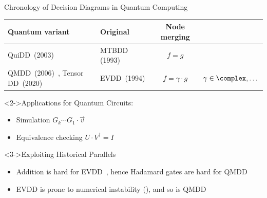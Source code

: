 \begin{refframe}{Chronology of Decision Diagrams in Quantum Computing}
	
\vspace{-.8em}

	
\begin{table}
\centering\footnotesize
\def\arraystretch{1.5}
\begin{tabular}{|p{4.5cm}|p{1.5cm}|c|c|}
\hline
\textbf{Quantum variant}	&
\textbf{Original}				& \textbf{Node merging} &  \\\hline
 QuiDD~(2003)~\cite{viamontes2003improving}					    &MTBDD (1993)  & $f = g$  &  \\
 QMDD~(2006)~\cite{qmdd}, Tensor DD~(2020)~\cite{hong2022tensor}   & EVDD~(1994)  &$f = \gamma\cdot g$   & $\gamma \in \complex, \dots$  \\
\hline
\end{tabular}
\end{table}

\vspace{-.3em}



\begin{block}<2->{Applications for Quantum Circuits:}
\begin{itemize}
	\item Simulation			\hfill   $G_k\cdots G_1 \cdot \vec v$
	\item Equivalence checking	 \hfill $U \cdot V^\dagger = I$
\end{itemize}
\end{block}


\begin{alertblock}<3->{Exploiting Historical Parallels}
	\begin{itemize}
	\item<+-> Addition is hard for EVDD~\cite{fargier2013semiring}, hence Hadamard gates are hard for QMDD
	\item<+-> EVDD is prone to numerical instability (\cite{aadd}), and so is QMDD~\cite{niemann2020overcoming}
	\end{itemize}
\end{alertblock}
\vspace{-.8em}


\end{refframe}




